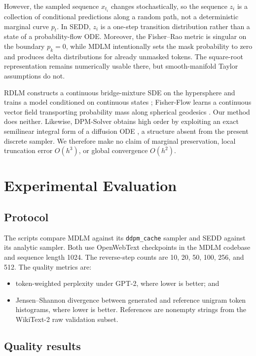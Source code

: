 \documentclass[10pt]{article}
\begin{document}
However, the sampled sequence $x_{t_i}$ changes stochastically, so the sequence $z_i$ is a collection
of conditional predictions along a random path, not a deterministic marginal curve $p_t$.  In SEDD,
$z_i$ is a one-step transition distribution rather than a state of a probability-flow ODE.  Moreover,
the Fisher--Rao metric is singular on the boundary $p_k=0$, while MDLM intentionally sets the mask
probability to zero and produces delta distributions for already unmasked tokens.  The square-root
representation remains numerically usable there, but smooth-manifold Taylor assumptions do not.

RDLM constructs a continuous bridge-mixture SDE on the hypersphere and trains a model conditioned on
continuous states \citep{jo2025rdlm}; Fisher-Flow learns a continuous vector field transporting
probability mass along spherical geodesics \citep{davis2024fisherflow}.  Our method does neither.
Likewise, DPM-Solver obtains high order by exploiting an exact semilinear integral form of a diffusion
ODE \citep{lu2022dpmsolver}, a structure absent from the present discrete sampler.  We therefore make
no claim of marginal preservation, local truncation error $O(h^3)$, or global convergence $O(h^2)$.

\section{Experimental Evaluation}

\subsection{Protocol}

The scripts compare MDLM against its \texttt{ddpm\_cache} sampler and SEDD against its analytic sampler.
Both use OpenWebText checkpoints in the MDLM codebase and sequence length 1024.  The reverse-step counts
are 10, 20, 50, 100, 256, and 512.  The quality metrics are:
\begin{itemize}
  \item token-weighted perplexity under GPT-2, where lower is better; and
  \item Jensen--Shannon divergence between generated and reference unigram token histograms, where
  lower is better.  References are nonempty strings from the WikiText-2 raw validation subset.
\end{itemize}

\subsection{Quality results}
\end{document}
